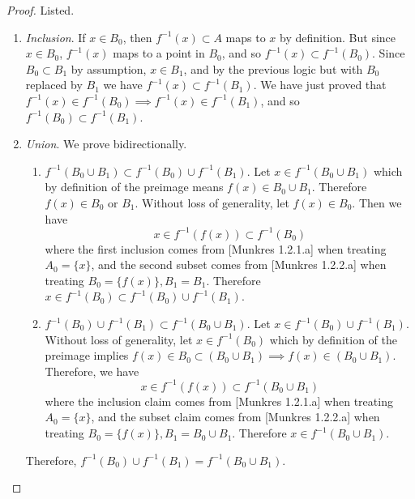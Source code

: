 \documentclass{article}
\begin{document}
    \begin{proof}
      Listed. 
      \begin{enumerate}
        \item \textit{Inclusion}. If $x \in B_0$, then $f^{-1} (x) \subset A$ maps to $x$ by definition. But since $x \in B_0$, $f^{-1} (x)$ maps to a point in $B_0$, and so $f^{-1} (x) \subset f^{-1} (B_0)$. Since $B_0 \subset B_1$ by assumption, $x \in B_1$, and by the previous logic but with $B_0$ replaced by $B_1$ we have $f^{-1}(x) \subset f^{-1} (B_1)$. We have just proved that $f^{-1} (x) \in f^{-1} (B_0)  \implies f^{-1} (x) \in f^{-1} (B_1)$, and so $f^{-1} (B_0) \subset f^{-1} (B_1)$. 

        \item \textit{Union}. We prove bidirectionally. 
        \begin{enumerate}
          \item $f^{-1} (B_0 \cup B_1) \subset f^{-1} (B_0) \cup f^{-1} (B_1)$. Let $x \in f^{-1} (B_0 \cup B_1)$ which by definition of the preimage means $f(x) \in B_0 \cup B_1$. Therefore $f(x) \in B_0$ or $B_1$. Without loss of generality, let $f(x) \in B_0$. Then we have 
            \begin{equation}
              x \in f^{-1} (f(x)) \subset f^{-1} (B_0)
            \end{equation} 
            where the first inclusion comes from [Munkres 1.2.1.a] when treating $A_0 = \{x\}$, and the second subset comes from [Munkres 1.2.2.a] when treating $B_0 = \{f(x)\}, B_1 = B_1$. Therefore $x \in f^{-1} (B_0) \subset f^{-1} (B_0) \cup f^{-1} (B_1)$. 
          \item $f^{-1} (B_0) \cup f^{-1} (B_1) \subset f^{-1} (B_0 \cup B_1)$. Let $x \in f^{-1}(B_0) \cup f^{-1} (B_1)$. Without loss of generality, let $x \in f^{-1}(B_0)$ which by definition of the preimage implies $f(x) \in B_0 \subset (B_0 \cup B_1) \implies f(x) \in (B_0 \cup B_1)$. Therefore, we have 
            \begin{equation}
              x \in f^{-1} (f(x)) \subset f^{-1} (B_0 \cup B_1)
            \end{equation} 
            where the inclusion claim comes from [Munkres 1.2.1.a] when treating $A_0 = \{x\}$, and the subset claim comes from [Munkres 1.2.2.a] when treating $B_0 = \{f(x)\}, B_1 = B_0 \cup B_1$. Therefore $x \in f^{-1} (B_0 \cup B_1)$. 
        \end{enumerate}
        Therefore, $f^{-1} (B_0) \cup f^{-1} (B_1) = f^{-1} (B_0 \cup B_1)$. 


\end{enumerate}
\end{proof}
\end{document}
